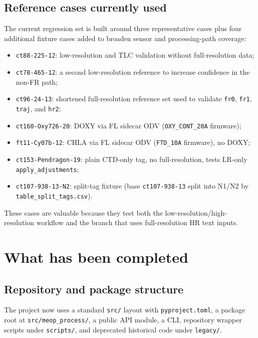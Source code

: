 \documentclass[11pt,a4paper]{article}
\newcommand{\pkg}[1]{\texttt{#1}}
\begin{document}
\subsection{Reference cases currently used}

The current regression set is built around three representative cases plus four additional fixture cases added to broaden sensor and processing-path coverage:

\begin{itemize}[leftmargin=1.5em]
  \item \pkg{ct88-225-12}: low-resolution and TLC validation without full-resolution data;
  \item \pkg{ct78-465-12}: a second low-resolution reference to increase confidence in the non-FR path;
  \item \pkg{ct96-24-13}: shortened full-resolution reference set used to validate \pkg{fr0}, \pkg{fr1}, \pkg{traj}, and \pkg{hr2};
  \item \pkg{ct160-Oxy726-20}: DOXY via FL sidecar ODV (\pkg{OXY\_CONT\_20A} firmware);
  \item \pkg{ft11-Cy07b-12}: CHLA via FL sidecar ODV (\pkg{FTD\_10A} firmware), no DOXY;
  \item \pkg{ct153-Pendragon-19}: plain CTD-only tag, no full-resolution, tests LR-only \pkg{apply\_adjustments};
  \item \pkg{ct107-938-13-N2}: split-tag fixture (base \pkg{ct107-938-13} split into N1/N2 by \pkg{table\_split\_tags.csv}).
\end{itemize}

These cases are valuable because they test both the low-resolution/high-resolution workflow and the branch that uses full-resolution HR text inputs.

\section{What has been completed}

\subsection{Repository and package structure}

The project now uses a standard \pkg{src/} layout with \pkg{pyproject.toml}, a package root at \pkg{src/meop\_process/}, a public API module, a CLI, repository wrapper scripts under \pkg{scripts/}, and deprecated historical code under \pkg{legacy/}.
\end{document}
